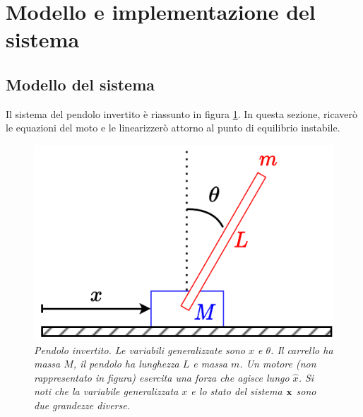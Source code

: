 \section{Modello e implementazione del sistema}\label{sec:modello}
\subsection{Modello del sistema}\label{subsec:modello-del-sistema}
Il sistema del pendolo invertito è riassunto in figura \ref{fig:sistema}.
In questa sezione, ricaverò le equazioni del moto e le linearizzerò attorno al punto di equilibrio instabile.

\begin{figure}[h]
    \includegraphics{../assets/sistema.pdf}
  \caption{\emph{Pendolo invertito. Le variabili generalizzate sono $x$ e $\theta$. Il carrello ha massa $M$,
  il pendolo ha lunghezza $L$ e massa $m$. Un motore (non rappresentato in figura) esercita una forza che agisce
  lungo $\hat x$. Si noti che la variabile generalizzata $x$ e lo stato del sistema $\bf x$ sono due grandezze diverse.}}
  \label{fig:sistema}
\end{figure}


